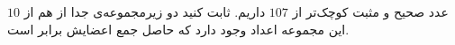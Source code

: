     \p 
$10$
عدد صحیح و مثبت کوچک‌تر از
$107$
داریم. ثابت کنید دو زیرمجموعه‌ی جدا از هم از این مجموعه اعداد وجود دارد که حاصل جمع اعضایش برابر است.